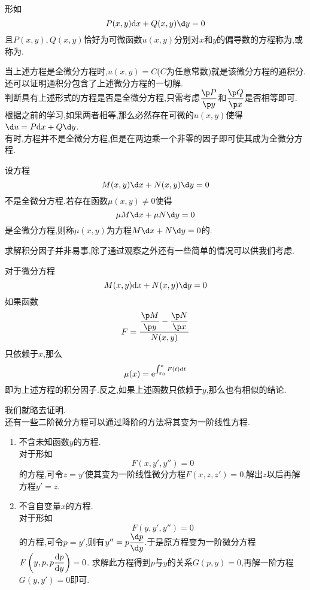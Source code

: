 \documentclass{ctexart}
\begin{document}
\begin{theorem}[2.4.1 全微分方程]
    形如
    \[P(x,y)\dx+Q(x,y)\d y=0\]
    且$P(x,y),Q(x,y)$恰好为可微函数$u(x,y)$分别对$x$和$y$的偏导数的方程称为,或称为.
\end{theorem}\noindent
当上述方程是全微分方程时,$u(x,y)=C$($C$为任意常数)就是该微分方程的通积分.还可以证明通积分包含了上述微分方程的一切解.\\
判断具有上述形式的方程是否是全微分方程,只需考虑$\dfrac{\p P}{\p y}$和$\dfrac{\p Q}{\p x}$是否相等即可.%
根据之前的学习,如果两者相等,那么必然存在可微的$u(x,y)$使得$\d u=P\dx+Q\d y$.\\
有时,方程并不是全微分方程,但是在两边乘一个非零的因子即可使其成为全微分方程.
\begin{theorem}[2.4.2 积分因子]
    设方程
    \[M(x,y)\d x+N(x,y)\d y=0\]
    不是全微分方程.若存在函数$\mu(x,y)\neq0$使得
    \[\mu M\d x+\mu N\d y=0\]
    是全微分方程,则称$\mu(x,y)$为方程$M\d x+N\d y=0$的.
\end{theorem}\noindent
求解积分因子并非易事,除了通过观察之外还有一些简单的情况可以供我们考虑.
\begin{theorem}[2.4.3 积分因子的特殊解]
    对于微分方程
    \[M(x,y)\dx+N(x,y)\d y=0\]
    如果函数
    \[F=\dfrac{\dfrac{\p M}{\p y}-\dfrac{\p N}{\p x}}{N(x,y)}\]
    只依赖于$x$,那么
    \[\mu(x)=\mathrm{e}^{\int_{x_0}^{x}F(t)\mathrm{d} t}\]
    即为上述方程的积分因子.反之,如果上述函数只依赖于$y$,那么也有相似的结论.
\end{theorem}\noindent
我们就略去证明.\\
还有一些二阶微分方程可以通过降阶的方法将其变为一阶线性方程.
\begin{enumerate}[label=\tbf{\arabic*.}]
    \item 不含未知函数$y$的方程.\\
        对于形如
        \[F(x,y',y'')=0\]
        的方程,可令$z=y'$使其变为一阶线性微分方程$F(x,z,z')=0$,解出$z$以后再解方程$y'=z$.
    \item 不含自变量$x$的方程.\\
        对于形如
        \[F(y,y',y'')=0\]
        的方程,可令$p=y'$,则有$y''=p\dfrac{\d p}{\d y}$.于是原方程变为一阶微分方程$F\left(y,p,p\dfrac{\mathrm{d} p}{\mathrm{d} y}\right)=0$.%
        求解此方程得到$p$与$y$的关系$G(p,y)=0$,再解一阶方程$G(y,y')=0$即可.
\end{enumerate}
\end{document}
